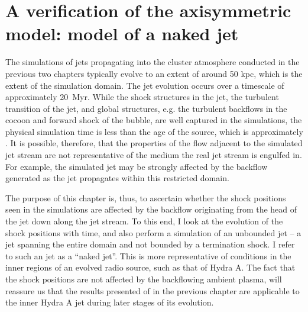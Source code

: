 \chapter{A verification of the axisymmetric model: model of a naked jet}\label{chapter6}
% 
%
The simulations of jets propagating into the cluster atmosphere conducted in the previous two chapters typically evolve to an extent of around 50 kpc, which is the extent of the simulation domain. The jet evolution occurs over a timescale of approximately 20~Myr. While the shock structures in the jet, the turbulent transition of the jet, and global structures, e.g. the turbulent backflows in the cocoon and forward shock of the bubble, are well captured in the simulations, the physical simulation time is less than the age of the source, which is approximately . It is possible, therefore, that the properties of the flow adjacent to the simulated jet stream are not representative of the medium the real jet stream is engulfed in. For example, the simulated jet may be strongly affected by the backflow generated as the jet propagates within this restricted domain.

The purpose of this chapter is, thus, to ascertain whether the shock positions seen in the simulations are affected by the backflow originating from the head of the jet down along the jet stream. To this end, I look at the evolution of the shock positions with time, and also perform a simulation of an unbounded jet -- a jet spanning the entire domain and not bounded by a termination shock. I refer to such an jet as a ``naked jet''. This is more representative of conditions in the inner regions of an evolved radio source, such as that of Hydra A. The fact that the shock positions are not affected by the backflowing ambient plasma, will reassure us that the results presented of in the previous chapter are applicable to the inner Hydra A jet during later stages of its evolution.


